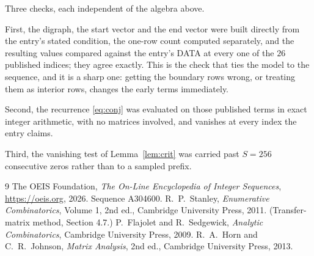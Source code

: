 \documentclass[11pt,a4paper]{article}
\theoremstyle{plain}
\theoremstyle{definition}
\begin{document}
Three checks, each independent of the algebra above.

First, the digraph, the start vector and the end vector were built directly from the
entry's stated condition, the one-row count computed separately, and the resulting values
compared against the entry's DATA at every one of the $26$ published indices; they
agree exactly. This is the check that ties the model to the sequence, and it is a sharp one:
getting the boundary rows wrong, or treating them as interior rows, changes the early terms
immediately.

Second, the recurrence \eqref{eq:conj} was evaluated on those published terms in exact
integer arithmetic, with no matrices involved, and vanishes at every index the entry claims.

Third, the vanishing test of Lemma~\ref{lem:crit} was carried past $S=256$ consecutive
zeros rather than to a sampled prefix.

\begin{thebibliography}{9}
 The OEIS Foundation, \emph{The On-Line Encyclopedia of Integer
Sequences}, \url{https://oeis.org}, 2026. Sequence A304600.
 R.~P.~Stanley, \emph{Enumerative Combinatorics}, Volume 1, 2nd ed.,
Cambridge University Press, 2011. (Transfer-matrix method, Section 4.7.)
 P.~Flajolet and R.~Sedgewick, \emph{Analytic Combinatorics}, Cambridge
University Press, 2009.
 R.~A.~Horn and C.~R.~Johnson, \emph{Matrix Analysis}, 2nd ed., Cambridge
University Press, 2013.
\end{thebibliography}
\end{document}
